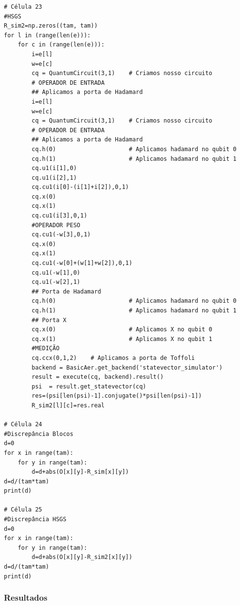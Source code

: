 \begin{verbatim}
# Célula 23
#HSGS
R_sim2=np.zeros((tam, tam))
for l in (range(len(e))):
    for c in (range(len(e))):
        i=e[l]
        w=e[c]
        cq = QuantumCircuit(3,1)    # Criamos nosso circuito        
        # OPERADOR DE ENTRADA
        ## Aplicamos a porta de Hadamard
        i=e[l]
        w=e[c]
        cq = QuantumCircuit(3,1)    # Criamos nosso circuito        
        # OPERADOR DE ENTRADA
        ## Aplicamos a porta de Hadamard
        cq.h(0)                     # Aplicamos hadamard no qubit 0
        cq.h(1)                     # Aplicamos hadamard no qubit 1     
        cq.u1(i[1],0)
        cq.u1(i[2],1)
        cq.cu1(i[0]-(i[1]+i[2]),0,1)
        cq.x(0)
        cq.x(1)
        cq.cu1(i[3],0,1)
        #OPERADOR PESO
        cq.cu1(-w[3],0,1)
        cq.x(0)
        cq.x(1)
        cq.cu1(-w[0]+(w[1]+w[2]),0,1)
        cq.u1(-w[1],0)
        cq.u1(-w[2],1)
        ## Porta de Hadamard
        cq.h(0)                     # Aplicamos hadamard no qubit 0
        cq.h(1)                     # Aplicamos hadamard no qubit 1
        ## Porta X
        cq.x(0)                     # Aplicamos X no qubit 0
        cq.x(1)                     # Aplicamos X no qubit 1
        #MEDIÇÃO
        cq.ccx(0,1,2)    # Aplicamos a porta de Toffoli
        backend = BasicAer.get_backend('statevector_simulator')    
        result = execute(cq, backend).result()                  
        psi  = result.get_statevector(cq)                        
        res=(psi[len(psi)-1].conjugate()*psi[len(psi)-1])
        R_sim2[l][c]=res.real

# Célula 24
#Discrepância Blocos
d=0
for x in range(tam):
    for y in range(tam):
        d=d+abs(O[x][y]-R_sim[x][y])
d=d/(tam*tam)
print(d)

# Célula 25
#Discrepância HSGS
d=0
for x in range(tam):
    for y in range(tam):
        d=d+abs(O[x][y]-R_sim2[x][y])
d=d/(tam*tam)
print(d)
\end{verbatim}

\subsubsection{Resultados}

